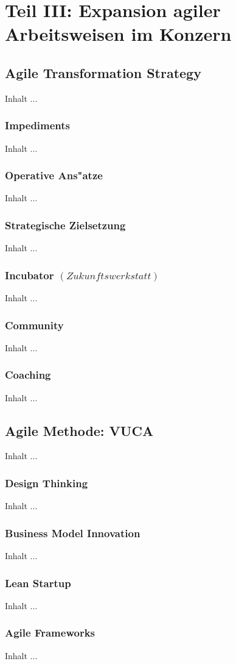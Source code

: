 
\chapter{Teil III: Expansion agiler Arbeitsweisen im Konzern}
\minitoc 
\vspace{1 cm} 

\section{Agile Transformation Strategy}
Inhalt ...

\subsection{Impediments}
Inhalt ...

\subsection{Operative Ans"atze}
Inhalt ...

\subsection{Strategische Zielsetzung}
Inhalt ...

\subsection{Incubator $(Zukunftswerkstatt)$}
Inhalt ...

\subsection{Community}
Inhalt ...

\subsection{Coaching}
Inhalt ...


\section{Agile Methode: VUCA}
Inhalt ...

\subsection{Design Thinking}
Inhalt ...

\subsection{Business Model Innovation}
Inhalt ...

\subsection{Lean Startup}
Inhalt ...

\subsection{Agile Frameworks}
Inhalt ...

